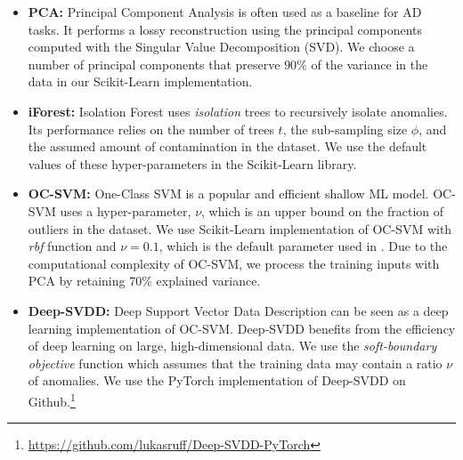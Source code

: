         
    



\begin{itemize}
    \item \textbf{PCA:} Principal Component Analysis is often used as a baseline for AD tasks. It performs a lossy reconstruction using the principal components computed with the Singular Value Decomposition (SVD). We choose a number of principal components that preserve $90\%$ of the variance in the data in our Scikit-Learn implementation.
    \item \textbf{iForest:} Isolation Forest uses \textit{isolation} trees to recursively isolate anomalies. Its performance relies on the number of trees $t$, the sub-sampling size $\phi$, and the assumed amount of contamination in the dataset. We use the default values of these hyper-parameters in the Scikit-Learn library.
    \item \textbf{OC-SVM:} One-Class SVM \cite{scholkopf1999support} is a popular and efficient shallow ML model. OC-SVM uses a hyper-parameter, $\nu$, which is an upper bound on the fraction of outliers in the dataset. We use Scikit-Learn implementation of OC-SVM with \textit{rbf} function and $\nu=0.1$, which is the default parameter used in \cite{scholkopf1999support}. Due to the computational complexity of OC-SVM, we process the training inputs with PCA by retaining 70\% explained variance.
    \item \textbf{Deep-SVDD:} Deep Support Vector Data Description \cite{pmlr-v80-ruff18a} can be seen as a deep learning implementation of OC-SVM. Deep-SVDD benefits from the efficiency of deep learning on large, high-dimensional data. We use the \textit{soft-boundary objective} function which assumes that the training data may contain a ratio $\nu$ of anomalies. We use the PyTorch implementation of Deep-SVDD on Github.\footnote{\url{https://github.com/lukasruff/Deep-SVDD-PyTorch}} %

\end{itemize}
